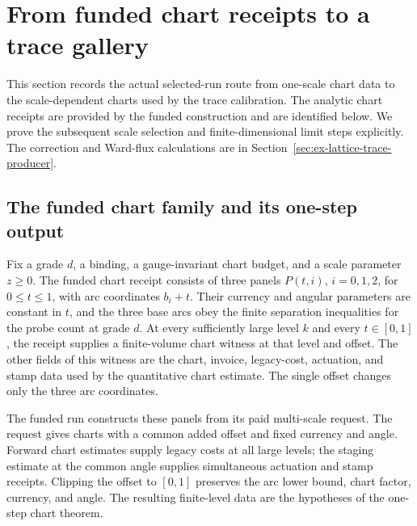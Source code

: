 \section{From funded chart receipts to a trace gallery}
\label{sec:ex-lattice-firesky-gallery}

This section records the actual selected-run route from one-scale chart data
to the scale-dependent charts used by the trace calibration. The analytic
chart receipts are provided by the funded construction and are identified
below. We prove the subsequent scale selection and finite-dimensional limit
steps explicitly. The correction and Ward-flux calculations are in
Section~\ref{sec:ex-lattice-trace-producer}.

\subsection{The funded chart family and its one-step output}

Fix a grade $d$, a binding, a gauge-invariant chart budget, and a scale
parameter $z\geq0$. The funded chart receipt consists of three panels
$P(t,i)$, $i=0,1,2$, for $0\leq t\leq1$, with arc coordinates $b_i+t$.
Their currency and angular parameters are constant in $t$, and the three
base arcs obey the finite separation inequalities for the probe count at
grade $d$. At every sufficiently large level $k$ and every $t\in[0,1]$,
the receipt supplies a finite-volume chart witness at that level and
offset. The other fields of this witness are the chart, invoice,
legacy-cost, actuation, and stamp data used by the quantitative chart
estimate. The single offset changes only the three arc coordinates.

The funded run constructs these panels from its paid multi-scale request.
The request gives charts with a common added offset and fixed currency and
angle. Forward chart estimates supply legacy costs at all large levels;
the staging estimate at the common angle supplies simultaneous actuation
and stamp receipts. Clipping the offset to $[0,1]$ preserves the arc lower
bound, chart factor, currency, and angle. The resulting finite-level data
are the hypotheses of the one-step chart theorem.

